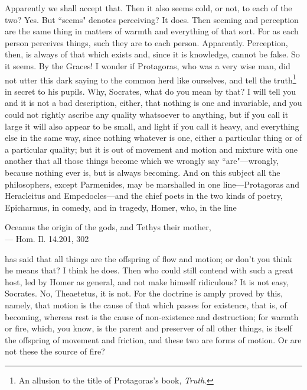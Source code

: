 \documentclass[letterpaper,12pt]{article}
\newcommand{\stephpag}[1]{\marginnote{\small\itshape\fontfamily{ppl}\selectfont #1}}
\begin{document}
\begin{drama}
\theaetetusspeaks
Apparently we shall accept that.
\socratesspeaks
Then it also seems cold, or not, to each of the two?
\theaetetusspeaks
Yes.
\socratesspeaks
But ``seems" denotes perceiving?
\theaetetusspeaks
It does. \stephpag{c}
\socratesspeaks
Then seeming and perception are the same thing in matters of warmth and everything of that sort. For as each person perceives things, such they are to each person.
\theaetetusspeaks
Apparently.
\socratesspeaks
Perception, then, is always of that which exists and, since it is knowledge, cannot be false.
\theaetetusspeaks
So it seems.
\socratesspeaks
By the Graces! I wonder if Protagoras, who was a very wise man, did not utter this dark saying to the common herd like ourselves, and tell the truth\footnote{An allusion to the title of Protagoras's book, \emph{Truth}.} in secret to his pupils. \stephpag{d}
\theaetetusspeaks
Why, Socrates, what do you mean by that?
\socratesspeaks
I will tell you and it is not a bad description, either, that nothing is one and invariable, and you could not rightly ascribe any quality whatsoever to anything, but if you call it large it will also appear to be small, and light if you call it heavy, and everything else in the same way, since nothing whatever is one, either a particular thing or of a particular quality; but it is out of movement and motion and mixture with one another that all those things become which we wrongly say ``are"—wrongly, because nothing ever is, but is always becoming. \stephpag{e} And on this subject all the philosophers, except Parmenides, may be marshalled in one line—Protagoras and Heracleitus and Empedocles—and the chief poets in the two kinds of poetry, Epicharmus, in comedy, and in tragedy, Homer, who, in the line
\begin{displayquote}
	Oceanus the origin of the gods, and Tethys their mother,\\
	--- Hom. Il. 14.201, 302
\end{displayquote}
has said that all things are the offspring of flow and motion; or don't you think he means that?
\theaetetusspeaks
I think he does.
\socratesspeaks
Then who could still contend with such a great host, \stephpag{153 a} led by Homer as general, and not make himself ridiculous?
\theaetetusspeaks
It is not easy, Socrates.
\socratesspeaks
No, Theaetetus, it is not. For the doctrine is amply proved by this, namely, that motion is the cause of that which passes for existence, that is, of becoming, whereas rest is the cause of non-existence and destruction; for warmth or fire, which, you know, is the parent and preserver of all other things, is itself the offspring of movement and friction, and these two are forms of motion. Or are not these the source of fire? \stephpag{b}

\end{drama}
\end{document}
